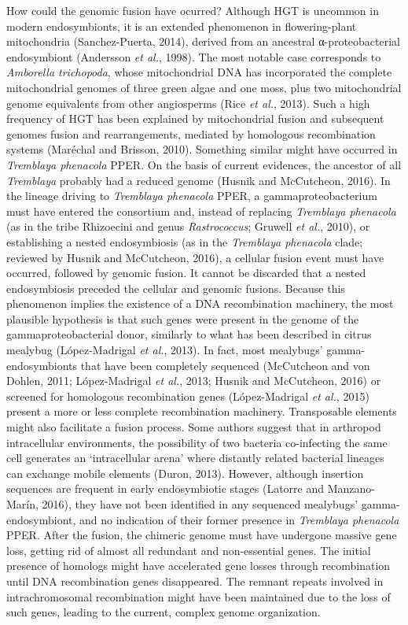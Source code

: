 \documentclass[11pt]{article}
\begin{document}
\begin{sloppypar}
How could the genomic fusion have ocurred? 
Although HGT is uncommon in modern endosymbionts, it is an extended phenomenon in flowering-plant mitochondria (Sanchez-Puerta, 2014), derived from an ancestral α-proteobacterial endosymbiont
(Andersson \textit{et al.}, 1998). 
The most notable case corresponds to \textit{Amborella trichopoda}, whose mitochondrial DNA has incorporated the complete mitochondrial genomes of three green algae and one moss, plus two mitochondrial genome equivalents from other angiosperms (Rice \textit{et al.}, 2013). 
Such a high frequency of HGT has been explained by mitochondrial fusion and subsequent genomes fusion and rearrangements, mediated by homologous recombination systems (Maréchal and Brisson, 2010). 
Something similar might have occurred in \textit{Tremblaya phenacola} PPER. 
On the basis of current evidences, the ancestor of all \textit{Tremblaya} probably had a reduced genome (Husnik and McCutcheon, 2016). 
In the lineage driving to \textit{Tremblaya phenacola} PPER, a gammaproteobacterium must have entered the consortium and, instead of replacing \textit{Tremblaya phenacola} (as in the tribe Rhizoecini and genus \textit{Rastrococcus}; Gruwell \textit{et al.}, 2010), or establishing a nested endosymbiosis (as in the \textit{Tremblaya phenacola} clade; reviewed by Husnik and McCutcheon, 2016), a cellular fusion event must have occurred, followed by genomic fusion. 
It cannot be discarded that a nested endosymbiosis preceded the cellular and genomic fusions. 
Because this phenomenon implies the existence of a DNA recombination machinery, the most plausible hypothesis is that such genes were present in the genome of the gammaproteobacterial donor, similarly to what has been described in citrus mealybug (López-Madrigal \textit{et al.}, 2013). 
In fact, most mealybugs’ gamma-endosymbionts that have been completely sequenced (McCutcheon and von Dohlen, 2011; López-Madrigal \textit{et al.}, 2013; Husnik and McCutcheon, 2016) or screened for homologous recombination genes (López-Madrigal \textit{et al.}, 2015) present a more or less complete recombination machinery. 
Transposable elements might also facilitate a fusion process. 
Some authors suggest that in arthropod intracellular environments, the possibility of two bacteria co-infecting the same cell generates an ‘intracellular arena’ where distantly related bacterial lineages can exchange mobile elements (Duron, 2013). 
However, although insertion sequences are frequent in early endosymbiotic stages (Latorre and Manzano-Marín, 2016), they have not been identified in any sequenced mealybugs’ gamma-endosymbiont, and no indication of their former presence in \textit{Tremblaya phenacola} PPER. 
After the fusion, the chimeric genome must have undergone massive gene loss, getting rid of almost all redundant and non-essential genes. 
The initial presence of homologs might have accelerated gene losses through recombination until DNA recombination genes disappeared. 
The remnant repeats involved in intrachromosomal recombination might have been maintained due to the loss of
such genes, leading to the current, complex genome organization.

\end{sloppypar}
\end{document}
